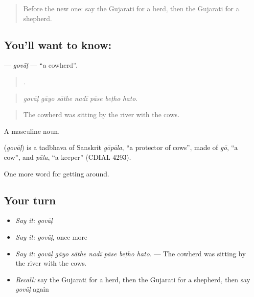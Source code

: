 \label{lesson:GU-C446-goval}



\begin{quote}
Before the new one: say the Gujarati for a herd, then the Gujarati for a shepherd.
\end{quote}

\subsection*{You'll want to know: }
\textbf{} — \emph{govāḷ} — \textquotedblleft{}a cowherd\textquotedblright{}.

\begin{quote}
      .
\end{quote}

\begin{quote}
\emph{govāḷ gāyo sāthe nadī pāse beṭho hato.}
\end{quote}

\begin{quote}
The cowherd was sitting by the river with the cows.
\end{quote}

A masculine noun.

\begin{cousinweb}
\textbf{} (\emph{govāḷ}) is a tadbhava of Sanskrit \emph{gōpāla}, \textquotedblleft{}a protector of cows\textquotedblright{}, made of \emph{gō}, \textquotedblleft{}a cow\textquotedblright{}, and \emph{pāla}, \textquotedblleft{}a keeper\textquotedblright{} (CDIAL 4293).
\end{cousinweb}

\begin{grammarlens}[title={What you've built}]
One more word for getting around.
\end{grammarlens}

\subsection*{Your turn}
\begin{itemize}
\raggedright
  \item \emph{Say it:} \emph{govāḷ}
  \item \emph{Say it:} \emph{govāḷ}, once more
  \item \emph{Say it:} \emph{govāḷ gāyo sāthe nadī pāse beṭho hato.} — The cowherd was sitting by the river with the cows.
  \item \emph{Recall:} say the Gujarati for a herd, then the Gujarati for a shepherd, then say \emph{govāḷ} again
\end{itemize}

